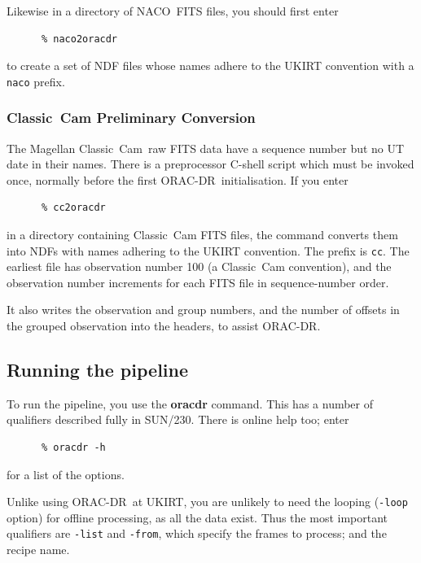\documentclass[twoside,11pt]{article}
\newcommand{\htmladdnormallink}[2]{#1}
\newcommand{\xref}[3]{#1}
\newcommand{\xlabel}[1]{}
\renewcommand{\_}{\texttt{\symbol{95}}}
\newcommand{\ORACDR}{{\footnotesize ORAC-DR}}
\newcommand{\UKIRT}{\htmladdnormallink{UKIRT}{http://www.jach.hawaii.edu/JACpublic/UKIRT/}}
\newcommand{\ClassicCam}{\htmladdnormallink{Classic~Cam}{http://www.ociw.edu/lco/magellan/instruments/Classic_Cam/}}
\newcommand{\NACO}{\htmladdnormallink{NACO}{http://www.eso.org/instruments/naco/}}
\begin{document}
Likewise in a directory of \NACO\ FITS files, you should first enter
\begin{verbatim}
      % naco2oracdr
\end{verbatim}
to create a set of NDF files whose names adhere to the UKIRT
convention with a {\tt naco} prefix.

\subsubsection{\xlabel{classiccam_preliminary_conversion}Classic~Cam Preliminary
Conversion\label{classiccam_preliminary_conversion}}

The Magellan \ClassicCam\ raw FITS data have a sequence number but no UT
date in their names.   There is a preprocessor C-shell script which must be
invoked once, normally before the first \ORACDR\ initialisation.  If you enter

\begin{verbatim}
      % cc2oracdr
\end{verbatim}
in a directory containing Classic~Cam FITS files, the command converts them
into NDFs with names adhering to the UKIRT convention.  The prefix
is {\tt cc}.  The earliest file has observation number 100 (a
Classic~Cam convention), and the observation number increments for each
FITS file in sequence-number order.

It also writes the observation and group numbers, and the number of
offsets in the grouped observation into the headers, to assist
ORAC-DR.

\subsection{\xlabel{running_the_pipeline}Running the
pipeline\label{running_the_pipeline}}

To run the pipeline, you use the {\bf oracdr} command.  This has a
number of qualifiers described fully in \xref{SUN/230}{sun230}{oracdr}.
There is online help too; enter

\begin{verbatim}
      % oracdr -h
\end{verbatim}
for a list of the options.

Unlike using \ORACDR\ at \UKIRT, you are unlikely to need the looping ({\tt -loop}
option) for offline processing, as all the data exist.  Thus the most
important qualifiers are {\tt -list} and {\tt -from}, which specify
the frames to process; and the recipe name.
\end{document}
